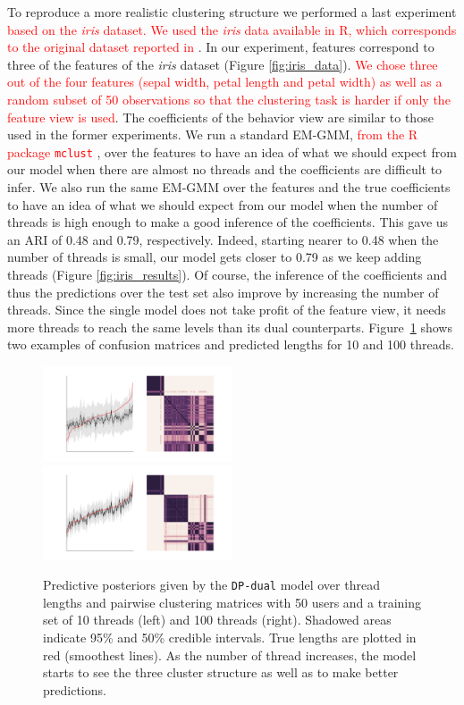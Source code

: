 \documentclass[smallextended]{svjour3}          %
\newcommand\alberto[1]{\textcolor{red}{#1}}
\begin{document}
To reproduce a more realistic clustering structure we performed a last experiment \alberto{based on the \textit{iris} dataset. We used the \textit{iris} data available in R, which corresponds to the original dataset reported in \cite{IrisData1935}}. In our experiment, features correspond to three of the features of the \textit{iris} dataset (Figure \ref{fig:iris_data}). \alberto{We chose three out of the four features (sepal width, petal length and petal width) as well as a random subset of 50 observations so that the clustering task is harder if only the feature view is used}. The coefficients of the behavior view are similar to those used in the former experiments. We run a standard EM-GMM, \alberto{from the R package \texttt{mclust} \citep{mclust}}, over the features to have an idea of what we should expect from our model when there are almost no threads and the coefficients are difficult to infer. We also run the same EM-GMM over the features and the true coefficients to have an idea of what we should expect from our model when the number of threads is high enough to make a good inference of the coefficients. This gave us an ARI of 0.48 and 0.79, respectively. Indeed, starting nearer to 0.48 when the number of threads is small, our model gets closer to 0.79 as we keep adding threads (Figure \ref{fig:iris_results}). Of course, the inference of the coefficients and thus the predictions over the test set also improve by increasing the number of threads. Since the single model does not take profit of the feature view, it needs more threads to reach the same levels than its dual counterparts. Figure~\ref{fig:iris_posteriors} shows two examples of confusion matrices and predicted lengths for 10 and 100 threads.
\begin{figure}
	\centering
	\includegraphics[width=0.5\textwidth]{Fig9_iris_posterior_10}%
	\includegraphics[width=0.5\textwidth]{Fig9_iris_posterior_100}
	\caption{Predictive posteriors given by the \texttt{DP-dual} model over thread lengths and pairwise clustering matrices with 50 users and a training set of 10 threads (left) and 100 threads (right). Shadowed areas indicate 95\% and 50\% credible intervals. True lengths are plotted in red (smoothest lines). As the number of thread increases, the model starts to see the three cluster structure as well as to make better predictions.}
	\label{fig:iris_posteriors}
\end{figure}
\end{document}
